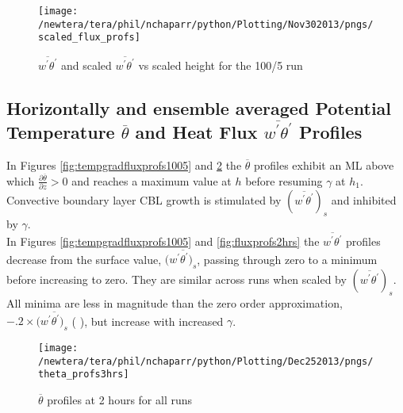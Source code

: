 \begin{figure}[htbp]
    \centering
    \texttt{[image: /newtera/tera/phil/nchaparr/python/Plotting/Nov302013/pngs/scaled\_flux\_profs]}
    \caption[$\overline{w^{'}\theta^{'}}$ scaled by $(\overline{w^{'}\theta^{'}})_{s}$]{$\overline{w^{'}\theta^{'}}$ and scaled $\overline{w^{'}\theta^{'}}$  vs scaled height for the 100/5 run}
    \label{fig:scaledfluxprofs15010}   %
\end{figure}

\clearpage

\subsection{Horizontally and ensemble averaged Potential Temperature $\overline{\theta}$ 
and Heat Flux $\overline{w^{'}\theta^{'}}$ Profiles}
\FloatBarrier

In Figures \ref{fig:tempgradfluxprofs1005} and \ref{fig:pottempprofs2hrs} the $\overline{\theta}$ profiles exhibit an \acs{ML} above which  $\frac{\partial\overline{\theta}}{\partial z}>0$ 
and reaches a maximum value at $h$ before resuming $\gamma$  at $h_{1}$.  Convective boundary layer \acs{CBL} growth is stimulated by $(\overline{w^{'}\theta^{'}})_{s}$ and inhibited by $\gamma$.\\

In Figures \ref{fig:tempgradfluxprofs1005} and  \ref{fig:fluxprofs2hrs} the $\overline{w^{'}\theta^{'}}$ profiles decrease from the surface value, $(\overline{w^{'}\theta^{'})_{s}}$, passing through zero to a minimum before increasing to zero.  They are similar across runs when scaled by $(\overline{w^{'}\theta^{'}})_{s}$. All minima are less  in magnitude than the zero order approximation, $-.2 \times (\overline{w^{'}\theta^{'})_{s}}$ (\citeauthor{Tennekes73} \citeyear{Tennekes73}), but increase with increased $\gamma$.\\


\begin{figure}[htbp]
    \centering
    \texttt{[image: /newtera/tera/phil/nchaparr/python/Plotting/Dec252013/pngs/theta\_profs3hrs]}
    \caption{$\overline{\theta}$ profiles at 2 hours for all runs}
    \label{fig:pottempprofs2hrs}   %
\end{figure}

